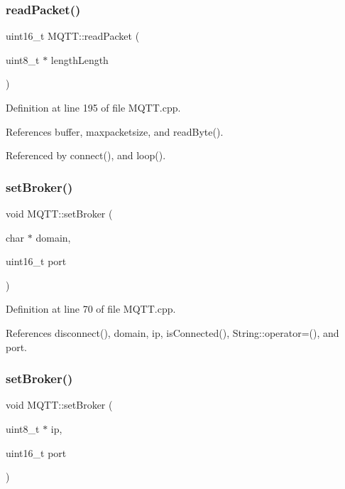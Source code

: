 \subsubsection{\texorpdfstring{read\+Packet()}{readPacket()}}
{\footnotesize\ttfamily uint16\+\_\+t M\+Q\+T\+T\+::read\+Packet (\begin{DoxyParamCaption}\item[{uint8\+\_\+t $\ast$}]{length\+Length }\end{DoxyParamCaption})\hspace{0.3cm}{\ttfamily [private]}}



Definition at line 195 of file M\+Q\+T\+T.\+cpp.



References buffer, maxpacketsize, and read\+Byte().



Referenced by connect(), and loop().

\mbox{\label{class_m_q_t_t_a07b3b97bcf999a2d0a292bca4f29bbc7}} 
\subsubsection{\texorpdfstring{set\+Broker()}{setBroker()}\hspace{0.1cm}{\footnotesize\ttfamily [1/2]}}
{\footnotesize\ttfamily void M\+Q\+T\+T\+::set\+Broker (\begin{DoxyParamCaption}\item[{char $\ast$}]{domain,  }\item[{uint16\+\_\+t}]{port }\end{DoxyParamCaption})}



Definition at line 70 of file M\+Q\+T\+T.\+cpp.



References disconnect(), domain, ip, is\+Connected(), String\+::operator=(), and port.

\mbox{\label{class_m_q_t_t_ad17765f1a34eacf2f0a3b384181a7129}} 
\subsubsection{\texorpdfstring{set\+Broker()}{setBroker()}\hspace{0.1cm}{\footnotesize\ttfamily [2/2]}}
{\footnotesize\ttfamily void M\+Q\+T\+T\+::set\+Broker (\begin{DoxyParamCaption}\item[{uint8\+\_\+t $\ast$}]{ip,  }\item[{uint16\+\_\+t}]{port }\end{DoxyParamCaption})}



